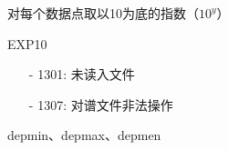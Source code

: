 \label{cmd:exp10}

对每个数据点取以10为底的指数（$10^y$）

\begin{SACSTX}
EXP10
\end{SACSTX}

\begin{itemize}
\item[-]1301: 未读入文件
\item[-]1307: 对谱文件非法操作
\end{itemize}

depmin、depmax、depmen
